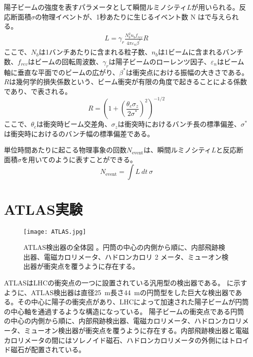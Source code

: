 陽子ビームの強度を表すパラメータとして瞬間ルミノシティ$L$が用いられる。反応断面積$\sigma$の物理イベントが、1秒あたりに生じるイベント数 N はで与えられる。
\begin{align}
  \label{eq:lumi}
  L = \gamma_{r} \frac{N_{b}^{2} n_{b} f_{rev}}{4\pi \varepsilon_{n} \beta^*}R
\end{align}
ここで、$N_{b}$は1バンチあたりに含まれる粒子数、$n_{b}$は1ビームに含まれるバンチ数、$f_{rev}$はビームの回転周波数、$\gamma_{r}$は陽子ビームのローレンツ因子、$\varepsilon_{n}$はビーム軸に垂直な平面でのビームの広がり、$\beta^{*}$は衝突点における振幅の大きさである。$R$は幾何学的損失係数という、ビーム衝突が有限の角度で起きることによる係数であり、で表される。
\begin{equation}
  \label{eq:kikaf}
  R=\left( 1+\left( \frac{\theta_{c}\sigma_{z}}{2\sigma^{*}} \right)^2 \right)^{-1/2}
\end{equation}
ここで、$\theta_c$は衝突時ビーム交差角、$\sigma_z$は衝突時におけるバンチ長の標準偏差、$\sigma^*$は衝突時におけるのバンチ幅の標準偏差である。

単位時間あたりに起こる物理事象の回数$N_\mathrm{event}$は、瞬間ルミノシティ$L$と反応断面積$\sigma$を用いてのように表すことができる。
\begin{equation}
  \label{eq:hannnou}
  N_\mathrm{event} = \int L\ dt\ \sigma
\end{equation}




\section{ATLAS実験}
\label{sec:ATLAS}
\begin{figure}[tbp]
  \centering
  \texttt{[image: ATLAS.jpg]}
  \caption[ATLAS検出器]{ATLAS検出器の全体図 \cite{ATLAS}。円筒の中心の内側から順に、内部飛跡検出器、電磁カロリメータ、ハドロンカロリ
  2 メータ、ミューオン検出器が衝突点を覆うように存在する。}
  \label{fig:ATLAS}
\end{figure}


ATLASはLHCの衝突点の一つに設置されている汎用型の検出器である。 に示すように、ATLAS検出器は直径25\ \si{m}長さ44\ \si{m}の円筒型をした巨大な検出器である。その中心に陽子の衝突点があり、LHCによって加速された陽子ビームが円筒の中心軸を通過するような構造になっている。
陽子ビームの衝突点である円筒の中心の内側から順に、内部飛跡検出器、電磁カロリメータ、ハドロンカロリメータ、ミューオン検出器が衝突点を覆うように存在する。内部飛跡検出器と電磁カロリメータの間にはソレノイド磁石、ハドロンカロリメータの外側にはトロイド磁石が配置されている。



